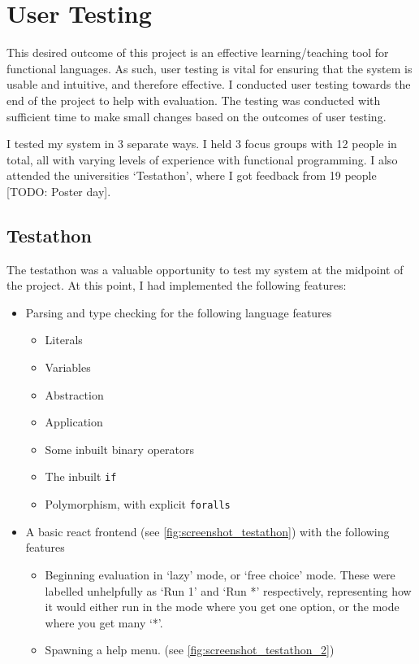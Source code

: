 \chapter{User Testing}
\label{chap:evaluation}

This desired outcome of this project is an effective learning/teaching tool for functional languages. As such, user testing is vital for ensuring that the system is usable and intuitive, and therefore effective. I conducted user testing towards the end of the project to help with evaluation. The testing was conducted with sufficient time to make small changes based on the outcomes of user testing.

I tested my system in 3 separate ways. I held 3 focus groups with 12 people in total, all with varying levels of experience with functional programming. I also attended the universities `Testathon', where I got feedback from 19 people [TODO: Poster day].

\section{Testathon}
The testathon was a valuable opportunity to test my system at the midpoint of the project. At this point, I had implemented the following features:

\begin{itemize}
    \item Parsing and type checking for the following language features
    \begin{itemize}
        \item Literals
        \item Variables
        \item Abstraction 
        \item Application
        \item Some inbuilt binary operators 
        \item The inbuilt \verb|if|
        \item Polymorphism, with explicit \verb|foralls|
    \end{itemize}
\item A basic react frontend (see \ref{fig:screenshot_testathon}) with the following features
\begin{itemize}
    \item Beginning evaluation in `lazy' mode, or `free choice' mode. These were labelled unhelpfully as `Run 1' and `Run *' respectively, representing how it would either run in the mode where you get one option, or the mode where you get many `*'.
    \item Spawning a help menu. (see \ref{fig:screenshot_testathon_2})
\end{itemize}
\end{itemize}
